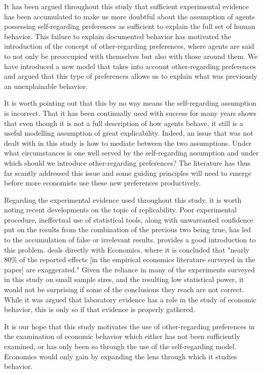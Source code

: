 \documentclass[12pt]{article}
\begin{document}
It has been argued throughout this study that sufficient experimental evidence has been accumulated to make us more doubtful about the assumption of agents possessing self-regarding preferences as sufficient to explain the full set of human behavior. This failure to explain documented behavior has motivated the introduction of the concept of other-regarding preferences, where agents are said to not only be preoccupied with themselves but also with those around them. We have introduced a new model that takes into account other-regarding preferences and argued that this type of preferences allows us to explain what was previously an unexplainable behavior.

It is worth pointing out that this by no way means the self-regarding assumption is incorrect. That it has been continually used with success for many years shows that even though it is not a full description of how agents behave, it still is a useful modelling assumption of great explicability. Indeed, an issue that was not dealt with in this study is how to mediate between the two assumptions. Under what circumstances is one well served by the self-regarding assumption and under which should we introduce other-regarding preferences? The literature has thus far scantly addressed this issue and some guiding principles will need to emerge before more economists use these new preferences productively.

Regarding the experimental evidence used throughout this study, it is worth noting recent developments on the topic of replicability. Poor experimental procedure, ineffectual use of statistical tools, along with unwarranted confidence put on the results from the combination of the previous two being true, has led to the accumulation of false or irrelevant results. \cite{ioannidis2005most} provides a good introduction to this problem. \cite{ioannidis2017power} deals directly with Economics, where it is concluded that "nearly 80\% of the reported effects [in the empirical economics literature surveyed in the paper] are exaggerated." Given the reliance in many of the experiments surveyed in this study on small sample sizes, and the resulting low statistical power, it would not be surprising if some of the conclusions they reach are not correct. While it was argued that laboratory evidence has a role in the study of economic behavior, this is only so if that evidence is properly gathered. 

It is our hope that this study motivates the use of other-regarding preferences in the examination of economic behavior which either has not been sufficiently examined, or has only been so through the use of the self-regarding model. Economics would only gain by expanding the lens through which it studies behavior. 
 
\end{document}
